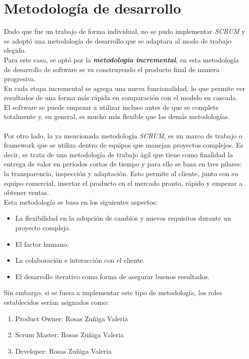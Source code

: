 \documentclass[letterpaper,12pt]{article}
\begin{document}
\section{Metodología de desarrollo}
Dado que fue un trabajo de forma individual, no se pudo implementar \textsl{SCRUM} y se adoptó una metodología de desarrollo que se adaptara al modo de trabajo elegido.\\ Para este caso, se optó por la \textbf{\textsl{metodología incremental}}, en esta metodología de desarrollo de software se va construyendo el producto final de manera progresiva. \\En cada etapa incremental se agrega una nueva funcionalidad, lo que permite ver resultados de una forma más rápida en comparación con el modelo en cascada. \\El software se puede empezar a utilizar incluso antes de que se complete totalmente y, en general, es mucho más flexible que las demás metodologías.
\\\\
Por otro lado, la ya mencionada metodología \textsl{SCRUM}, es un marco de trabajo o framework que se utiliza dentro de equipos que manejan proyectos complejos. Es decir, se trata de una metodología de trabajo ágil que tiene como finalidad la entrega de valor en períodos cortos de tiempo y para ello se basa en tres pilares: la transparencia, inspección y adaptación. Esto permite al cliente, junto con su equipo comercial, insertar el producto en el mercado pronto, rápido y empezar a obtener ventas.\\
Esta metodología se basa en los siguientes aspectos:
\begin{itemize}
	\item La flexibilidad en la adopción de cambios y nuevos requisitos durante un proyecto complejo.
	\item El factor humano.
	\item La colaboración e interacción con el cliente.
	\item El desarrollo iterativo como forma de asegurar buenos resultados.
\end{itemize}
Sin embargo, si se fuera a implementar este tipo de metodología, los roles establecidos serían asignados como:
\begin{enumerate}
	\item Product Owner: Rosas Zuñiga Valeria
	\item Scrum Master: Rosas Zuñiga Valeria
	\item Developer: Rosas Zuñiga Valeria
\end{enumerate}
\end{document}
